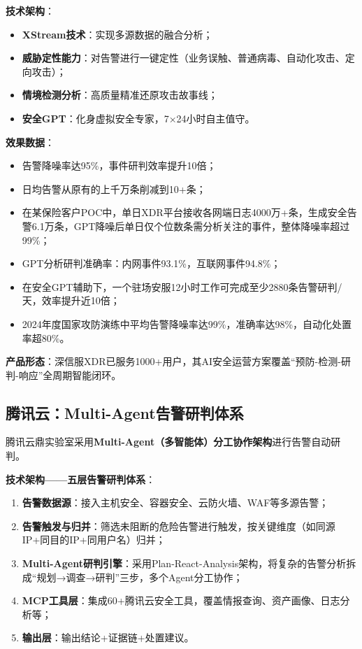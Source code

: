 \documentclass[11pt,a4paper]{article}
\begin{document}
\textbf{技术架构}：
\begin{itemize}
    \item \textbf{XStream技术}：实现多源数据的融合分析；
    \item \textbf{威胁定性能力}：对告警进行一键定性（业务误触、普通病毒、自动化攻击、定向攻击）；
    \item \textbf{情境检测分析}：高质量精准还原攻击故事线；
    \item \textbf{安全GPT}：化身虚拟安全专家，7×24小时自主值守。
\end{itemize}

\textbf{效果数据}：
\begin{itemize}
    \item 告警降噪率达95\%，事件研判效率提升10倍；
    \item 日均告警从原有的上千万条削减到10+条；
    \item 在某保险客户POC中，单日XDR平台接收各网端日志4000万+条，生成安全告警6.1万条，GPT降噪后单日仅个位数条需分析关注的事件，整体降噪率超过99\%；
    \item GPT分析研判准确率：内网事件93.1\%，互联网事件94.8\%；
    \item 在安全GPT辅助下，一个驻场安服12小时工作可完成至少2880条告警研判/天，效率提升近10倍；
    \item 2024年度国家攻防演练中平均告警降噪率达99\%，准确率达98\%，自动化处置率超80\%。
\end{itemize}

\textbf{产品形态}：深信服XDR已服务1000+用户，其AI安全运营方案覆盖“预防-检测-研判-响应”全周期智能闭环。

\subsection{腾讯云：Multi-Agent告警研判体系}

腾讯云鼎实验室采用\textbf{Multi-Agent（多智能体）分工协作架构}进行告警自动研判。

\textbf{技术架构——五层告警研判体系}：
\begin{enumerate}[label=第\arabic*层：]
    \item \textbf{告警数据源}：接入主机安全、容器安全、云防火墙、WAF等多源告警；
    \item \textbf{告警触发与归并}：筛选未阻断的危险告警进行触发，按关键维度（如同源IP+同目的IP+同用户名）归并；
    \item \textbf{Multi-Agent研判引擎}：采用Plan-React-Analysis架构，将复杂的告警分析拆成“规划→调查→研判”三步，多个Agent分工协作；
    \item \textbf{MCP工具层}：集成60+腾讯云安全工具，覆盖情报查询、资产画像、日志分析等；
    \item \textbf{输出层}：输出结论+证据链+处置建议。
\end{enumerate}
\end{document}
